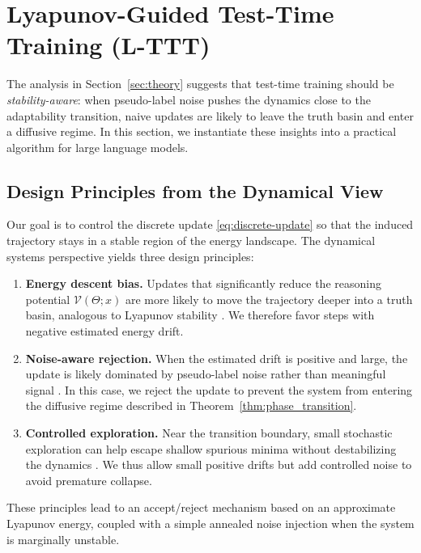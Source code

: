 \documentclass{article}
\theoremstyle{plain}
\theoremstyle{definition}
\theoremstyle{remark}
\newcommand{\Lyap}{\mathcal{V}}            %
\begin{document}
\section{Lyapunov-Guided Test-Time Training (L-TTT)}
\label{sec:method}

The analysis in Section~\ref{sec:theory} suggests that test-time training should be \emph{stability-aware}: when pseudo-label noise pushes the dynamics close to the adaptability transition, naive updates are likely to leave the truth basin and enter a diffusive regime. In this section, we instantiate these insights into a practical algorithm for large language models.

\subsection{Design Principles from the Dynamical View}

Our goal is to control the discrete update \eqref{eq:discrete-update} so that the induced trajectory stays in a stable region of the energy landscape. The dynamical systems perspective yields three design principles:

\begin{enumerate}
    \item \textbf{Energy descent bias.} Updates that significantly reduce the reasoning potential $\Lyap(\Theta; x)$ are more likely to move the trajectory deeper into a truth basin, analogous to Lyapunov stability \cite{khalil2002lyapunov,strogatz2018}. We therefore favor steps with negative estimated energy drift.
    \item \textbf{Noise-aware rejection.} When the estimated drift is positive and large, the update is likely dominated by pseudo-label noise rather than meaningful signal \cite{chen2024understanding,kumar2024consistency}. In this case, we reject the update to prevent the system from entering the diffusive regime described in Theorem~\ref{thm:phase_transition}.
    \item \textbf{Controlled exploration.} Near the transition boundary, small stochastic exploration can help escape shallow spurious minima without destabilizing the dynamics \cite{bahri2024statmech,welling2011bayesian}. We thus allow small positive drifts but add controlled noise to avoid premature collapse.
\end{enumerate}

These principles lead to an accept/reject mechanism based on an approximate Lyapunov energy, coupled with a simple annealed noise injection when the system is marginally unstable.
\end{document}
